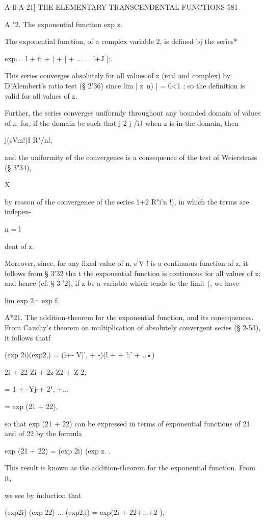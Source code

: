 A-ll-A-21] THE ELEMENTARY TRANSCENDENTAL FUNCTIONS 581

A "2. The exponential function exp z.

The exponential function, of a complex variable 2, is defined bj the
series*

exp.= l + f; + | + | + ... = l+J |;.

This series converges absolutely for all values of z (real and
complex) by D'Alembert's ratio test (§ 2'36) since lim | z\ n) | = 0<1
; so the definition is valid for all values of z.

Further, the series converges uniformly throughout any bounded domain
of values of z; for, if the domain be such that j 2 j /iJ when z is
in the domain, then

j(sVm!)I R"/nl,

and the uniformity of the convergence is a consequence of the test of
Weierstrass (§ 3"34),

X

by reason of the convergence of the series 1+2 R"i'n !), in which the
terms are indepen-

n = l

dent of z.

Moreover, since, for any fixed value of n, s'V ! is a continuous
function of z, it follows from § 3'32 tha t the exponential function
is continuous for all values of z; and hence (cf. § 3 '2), if z be a
variable which tends to the limit (, we have

lim exp 2= exp f.

A*21. The addition-theorem for the exponential function, and its
consequences. From Cauchy's theorem on multiplication of absolutely
convergent series (§ 2-53), it follows thatf

(exp 2i)(exp2,) = (l+- V|', + -)(l + + !;' + ..•)

2i + 22 Zi + 2z Z2 + Z-2,

= 1 + -Yj-+ 2", +...

= exp (21 + 22),

so that exp (21 + 22) can be expressed in terms of exponential
functions of 21 and of 22 by the formula

exp (21 + 22) = (exp 2i) (exp z. .

This result is known as the addition-theorem for the exponential
function. From it,

we see by induction that

(exp2i) (exp 22) ... (exp2,i) = exp(2i + 22+...+2 ),


